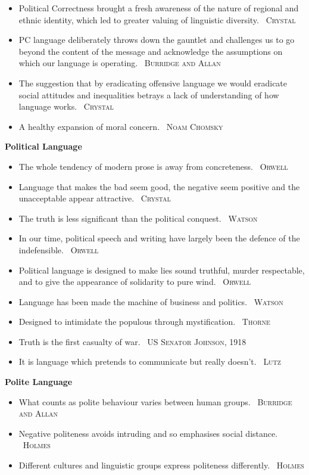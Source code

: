 \documentclass[10pt, a4paper]{article}
\newcommand{\heading}[1]{\textbf{#1}}
\newcommand{\linguist}[1]{\textemdash~\textsc{#1}}
\begin{document}
\begin{multicols}{2}
\begin{itemize}
    \item Political Correctness brought a fresh awareness of the nature of regional and ethnic identity, which led to greater valuing of linguistic diversity. \linguist{Crystal}
    \item PC language deliberately throws down the gauntlet and challenges us to go beyond the content of the message and acknowledge the assumptions on which our language is operating. \linguist{Burridge and Allan}
    \item The suggestion that by eradicating offensive language we would eradicate social attitudes and inequalities betrays a lack of understanding of how language works. \linguist{Crystal}
    \item A healthy expansion of moral concern. \linguist{Noam Chomsky}
  \end{itemize}
  \heading{Political Language}
  \begin{itemize}
    \item The whole tendency of modern prose is away from concreteness. \linguist{Orwell}
    \item Language that makes the bad seem good, the negative seem positive and the unacceptable appear attractive. \linguist{Crystal}
    \item The truth is less significant than the political conquest. \linguist{Watson}
    \item In our time, political speech and writing have largely been the defence of the indefensible. \linguist{Orwell}
    \item Political language is designed to make lies sound truthful, murder respectable, and to give the appearance of solidarity to pure wind. \linguist{Orwell}
    \item Language has been made the machine of business and politics. \linguist{Watson}
      \item Designed to intimidate the populous through mystification. \linguist{Thorne}
      \item Truth is the first casualty of war. \linguist{US Senator Johnson, 1918}
      \item It is language which pretends to communicate but really doesn't. \linguist{Lutz}
  \end{itemize}
  \heading{Polite Language}
  \begin{itemize}
    \item What counts as polite behaviour varies between human groups. \linguist{Burridge and Allan}
    \item Negative politeness avoids intruding and so emphasises social distance. \linguist{Holmes}
    \item Different cultures and linguistic groups express politeness differently. \linguist{Holmes}
  \end{itemize}
\end{multicols}
\end{document}

